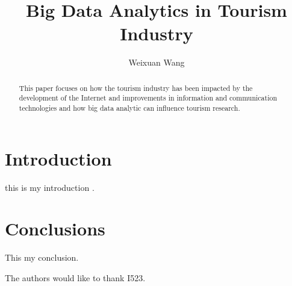 \documentclass[sigconf]{acmart}
\begin{document}
\title{Big Data Analytics in Tourism Industry}


\author{Weixuan Wang}


\renewcommand{\shortauthors}{W. Wang}


\begin{abstract}
This paper focuses on how the tourism industry has been impacted by the
development of the Internet and improvements in information and communication
technologies and how big data analytic can influence tourism research.
\end{abstract}



\maketitle

\section{Introduction}

this is my introduction \cite {7004475}. 

\section{Conclusions}

This my conclusion.


\begin{acks}

  The authors would like to thank I523.

\end{acks}


 
\end{document}
